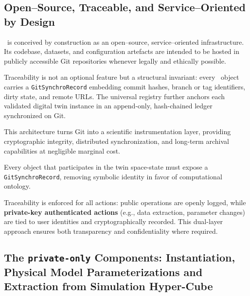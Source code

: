 \subsection{Open--Source, Traceable, and Service--Oriented by Design}

\hydrot\ is conceived by construction as an open--source, service--oriented infrastructure. Its codebase, datasets, and configuration artefacts are intended to be hosted in publicly accessible Git repositories whenever legally and ethically possible.

Traceability is not an optional feature but a structural invariant: every \hydrot\ object carries a \texttt{GitSynchroRecord} embedding commit hashes, branch or tag identifiers, dirty state, and remote URLs. The universal registry further anchors each validated digital twin instance in an append-only, hash-chained ledger synchronized on Git.

This architecture turns Git into a scientific instrumentation layer, providing cryptographic integrity, distributed synchronization, and long-term archival capabilities at negligible marginal cost.

Every object that participates in the twin space-state must expose a \texttt{GitSynchroRecord}, removing symbolic identity in favor of computational ontology.

Traceability is enforced for all actions: public operations are openly logged, while \textbf{private-key authenticated actions} (e.g., data extraction, parameter changes) are tied to user identities and cryptographically recorded. This dual-layer approach ensures both transparency and confidentiality where required.




\subsection{The \texttt{private-only} Components: Instantiation, Physical Model Parameterizations and Extraction from Simulation Hyper-Cube}
\label{sec:private-components}

